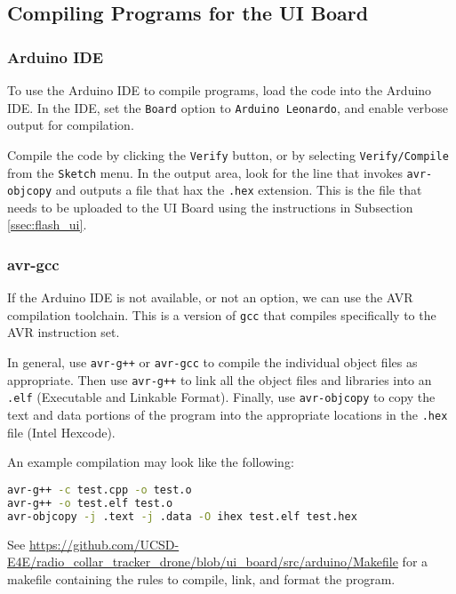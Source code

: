 \documentclass{report}
\begin{document}
			\subsection{Compiling Programs for the UI Board} \label{ssec:ui_compile}
				\subsubsection{Arduino IDE} \label{sssec:ui_arduino_compile}
					To use the Arduino IDE to compile programs, load the code into the Arduino IDE.  In the IDE, set the \lstinline{Board} option to \lstinline{Arduino Leonardo}, and enable verbose output for compilation.

					Compile the code by clicking the \lstinline{Verify} button, or by selecting \lstinline{Verify/Compile} from the \lstinline{Sketch} menu.  In the output area, look for the line that invokes \lstinline{avr-objcopy} and outputs a file that hax the \lstinline{.hex} extension.  This is the file that needs to be uploaded to the UI Board using the instructions in Subsection \ref{ssec:flash_ui}.

				\subsubsection{avr-gcc} \label{sssec:ui_make_compile}
					If the Arduino IDE is not available, or not an option, we can use the AVR compilation toolchain.  This is a version of \lstinline{gcc} that compiles specifically to the AVR instruction set.

					In general, use \lstinline{avr-g++} or \lstinline{avr-gcc} to compile the individual object files as appropriate.  Then use \lstinline{avr-g++} to link all the object files and libraries into an \lstinline{.elf} (Executable and Linkable Format).  Finally, use \lstinline{avr-objcopy} to copy the text and data portions of the program into the appropriate locations in the \lstinline{.hex} file (Intel Hexcode).

					An example compilation may look like the following:

					\begin{lstlisting}[language=sh, caption={Example avr-gcc compilation}, label={lst:avr-gcc_example}]
avr-g++ -c test.cpp -o test.o
avr-g++ -o test.elf test.o
avr-objcopy -j .text -j .data -O ihex test.elf test.hex
					\end{lstlisting}

					See \url{https://github.com/UCSD-E4E/radio_collar_tracker_drone/blob/ui_board/src/arduino/Makefile} for a makefile containing the rules to compile, link, and format the program.
\end{document}
